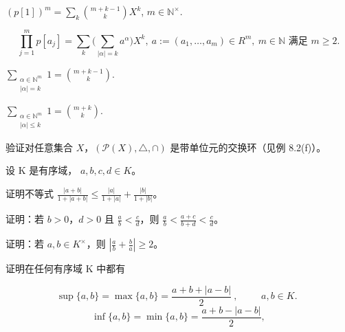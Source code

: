 \begin{exercises}
\begin{items}
\item

$ (p[1])^m = \sum_k \binom{m+k-1}{k} X^k $,  $ m \in \mathbb{N}^\times $.

\[
\prod_{j=1}^{m}p[a_{j}]=\sum_{k}\big(\sum_{|\alpha|=k}a^{\alpha}\big)X^{k},~a:=(a_{1},\ldots,a_{m})\in R^{m},~m\in\mathbb{N}\text{ 满足 }m\geq2.
\]
\end{items}

\begin{items}
\item[（c）]

$ \sum_{\substack{\alpha \in \mathbb{N}^m \\ |\alpha| = k}} 1 = \binom{m + k - 1}{k} $.

\item[（d）]

$ \sum_{\substack{\alpha \in \mathbb{N}^m \\ |\alpha| \leq k}} 1 = \binom{m + k}{k} $.

\end{items}

\item

验证对任意集合 $X$，$(\mathcal{P}(X), \triangle, \cap)$ 是带单位元的交换环（见例 8.2(f)）。

\item

设 K 是有序域， $ a, b, c, d \in K $。

\begin{items}
\item

证明不等式  $ \frac{|a+b|}{1+|a+b|} \leq \frac{|a|}{1+|a|} + \frac{|b|}{1+|b|} $。

\item

证明：若 $b > 0$，$d > 0$ 且 $\frac{a}{b} < \frac{c}{d}$，则 $\frac{a}{b} < \frac{a+c}{b+d} < \frac{c}{d}$。

\item

证明：若 $a, b \in K^\times$，则 $\left|\frac{a}{b} + \frac{b}{a}\right| \geq 2$。

\end{items}

\item

证明在任何有序域 K 中都有

\begin{equation*}
\sup\{a,b\}=\max\{a,b\}=\frac{a+b+\left|a-b\right|}{2}\ ,\qquad\begin{array}{l}a,b\in K.\end{array}
\end{equation*}
\[
\inf\{a,b\}=\min\{a,b\}=\frac{a+b-|a-b|}{2},
\]
\item


\end{exercises}
